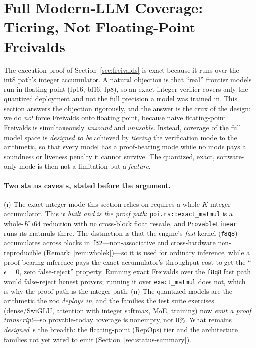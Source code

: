 \section{Full Modern-LLM Coverage: Tiering, Not Floating-Point Freivalds}
\label{sec:fp-coverage}

The execution proof of Section~\ref{sec:freivalds} is exact because it runs over the
int8 path's integer accumulator. A natural objection is that ``real'' frontier models
run in floating point (fp16, bf16, fp8), so an exact-integer verifier covers only the
quantized deployment and not the full precision a model was trained in. This section
answers the objection rigorously, and the answer is the crux of the design: we do
\emph{not} force Freivalds onto floating point, because naive floating-point Freivalds
is simultaneously \emph{unsound} and \emph{unusable}. Instead, coverage of the full
model space is \emph{designed to be} achieved by \emph{tiering} the verification mode to
the arithmetic, so
that every model has a proof-bearing mode while no mode pays a soundness or liveness
penalty it cannot survive. The quantized, exact, software-only mode is then not a
limitation but a \emph{feature}.

\paragraph{Two status caveats, stated before the argument.} (i) The exact-integer mode
this section relies on requires a whole-$K$ integer accumulator. This is \emph{built and is
the proof path}: \texttt{poi.rs::exact\_matmul} is a whole-$K$ $i64$ reduction with no
cross-block float rescale, and \texttt{ProvableLinear} runs its matmuls there. The
distinction is that the engine's \emph{fast} kernel (\texttt{f8q8}) accumulates across
blocks in \texttt{f32}---non-associative and cross-hardware non-reproducible
(Remark~\ref{rem:wholek})---so it is used for ordinary inference, while a proof-bearing
inference pays the exact accumulator's throughput cost to get the ``$\epsilon=0$, zero
false-reject'' property. Running exact Freivalds over the \texttt{f8q8} fast path would
false-reject honest provers; running it over \texttt{exact\_matmul} does not, which is why
the proof path is the integer path. (ii) The quantized models are the arithmetic the zoo
\emph{deploys in}, and the families the test suite exercises (dense/SwiGLU, attention with
integer softmax, MoE, training) now \emph{emit a proof transcript}---so provable-today
coverage is nonempty, not $0\%$. What remains \emph{designed} is the breadth: the
floating-point (RepOps) tier and the architecture families not yet wired to emit
(Section~\ref{sec:status-summary}).

